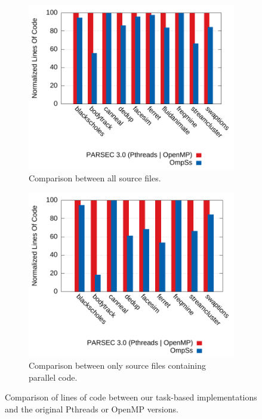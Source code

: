 \begin{figure}[!htbp]
        \centering
        \begin{subfigure}[b]{0.8\textwidth}
                \includegraphics[width=\textwidth]{ifcg/figures/absolute_loc_norm}%
                \caption{Comparison between all source files.}%
                \label{fig:absolute_loc}
                \vspace{0.4cm}
        \end{subfigure}%
				\hfill
        \begin{subfigure}[b]{0.8\textwidth}
        \includegraphics[width=\textwidth]{ifcg/figures/relative_loc_norm}%
        \caption{Comparison between only source files containing parallel code.}%
        \label{fig:relative_loc}%
        \end{subfigure}%
  \caption{Comparison of lines of code between our task-based implementations and the original Pthreads or OpenMP versions.}
        \label{fig:loc_comparison}
\end{figure}


